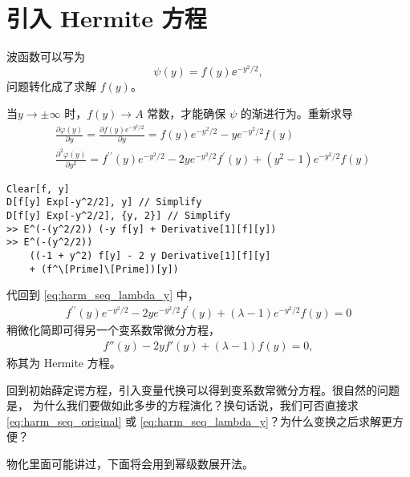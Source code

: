 \section{引入 Hermite 方程}
波函数可以写为
\begin{equation}
    \psi(y) = f(y) \ee^{-y^2/2},
\end{equation}
问题转化成了求解 $f(y)$。

当$y\rightarrow\pm\infty$ 时，$f(y) \rightarrow A$ 常数，才能确保 $\psi$ 的渐进行为。重新求导 
\begin{align}
    &\frac{\partial \varphi(y)}{\partial y}=\frac{\partial f(y) e^{-y^2/2}}{\partial y}=f(y) e^{-y^2 / 2}-y e^{-y^2 / 2} f(y) \\
    &\frac{\partial^2 \varphi(y)}{\partial y^2}=f^{\prime \prime}(y) e^{-y^2 / 2}-2 y e^{-y^2 / 2} f^{\prime}(y)+\left(y^2-1\right) e^{-y^2 / 2} f(y)
\end{align}
\begin{lstlisting}
Clear[f, y]
D[f[y] Exp[-y^2/2], y] // Simplify
D[f[y] Exp[-y^2/2], {y, 2}] // Simplify
>> E^(-(y^2/2)) (-y f[y] + Derivative[1][f][y])
>> E^(-(y^2/2)) 
    ((-1 + y^2) f[y] - 2 y Derivative[1][f][y] 
    + (f^\[Prime]\[Prime])[y])
\end{lstlisting}
代回到 \eqref{eq:harm_seq_lambda_y} 中，
\begin{align}
    f^{\prime \prime}(y) e^{-y^2 / 2}-2 y e^{-y^2 / 2} f^{\prime}(y)+(\lambda-1) e^{-y^2 / 2} f(y)=0
\end{align}
稍微化简即可得另一个变系数常微分方程，
\begin{align}
    f''(y) - 2y f'(y) + (\lambda - 1) f(y) = 0, 
    \label{eq:harm_lambda_y_simp} %
\end{align}
称其为 Hermite 方程。

回到初始薛定谔方程，引入变量代换可以得到变系数常微分方程。很自然的问题是，
为什么我们要做如此多步的方程演化？换句话说，我们可否直接求 \eqref{eq:harm_seq_original} 或 \eqref{eq:harm_seq_lambda_y}？为什么变换之后求解更方便？

物化里面可能讲过，下面将会用到幂级数展开法。

